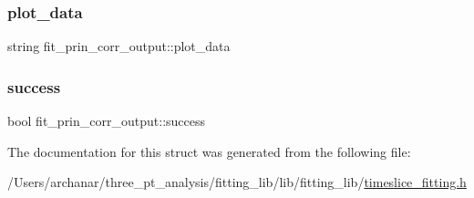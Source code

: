 \mbox{\label{structfit__prin__corr__output_aa13595cad65eaa412394974801a1a1dd}} 
\subsubsection{\texorpdfstring{plot\_data}{plot\_data}}
{\footnotesize\ttfamily string fit\+\_\+prin\+\_\+corr\+\_\+output\+::plot\+\_\+data}

\mbox{\label{structfit__prin__corr__output_acc7f5ba3e169a82e1b2ceb2cfc4865f9}} 
\subsubsection{\texorpdfstring{success}{success}}
{\footnotesize\ttfamily bool fit\+\_\+prin\+\_\+corr\+\_\+output\+::success}



The documentation for this struct was generated from the following file\+:\begin{DoxyCompactItemize}
\item 
/\+Users/archanar/three\+\_\+pt\+\_\+analysis/fitting\+\_\+lib/lib/fitting\+\_\+lib/\mbox{\hyperlink{lib_2fitting__lib_2timeslice__fitting_8h}{timeslice\+\_\+fitting.\+h}}\end{DoxyCompactItemize}
